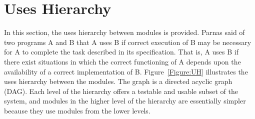 \documentclass[12pt]{article}
\begin{document}
\section{Uses Hierarchy}
\label{Sec:UH}
In this section, the uses hierarchy between modules is provided. Parnas said of two programs A and B that A uses B if correct execution of B may be necessary for A to complete the task described in its specification. That is, A uses B if there exist situations in which the correct functioning of A depends upon the availability of a correct implementation of B. Figure~\ref{Figure:UH} illustrates the uses hierarchy between the modules. The graph is a directed acyclic graph (DAG). Each level of the hierarchy offers a testable and usable subset of the system, and modules in the higher level of the hierarchy are essentially simpler because they use modules from the lower levels.
\end{document}
